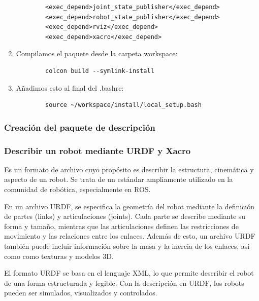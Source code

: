\begin{enumerate}
    \begin{lstlisting}
        <exec_depend>joint_state_publisher</exec_depend>
        <exec_depend>robot_state_publisher</exec_depend>
        <exec_depend>rviz</exec_depend>
        <exec_depend>xacro</exec_depend>
    \end{lstlisting}
    
    
    
    
    \item Compilamos el paquete desde la carpeta workspace:
    
    \begin{verbatim}
        colcon build --symlink-install
    \end{verbatim}
    
    \item Añadimos esto al final del .bashrc:
    \begin{verbatim}
        source ~/workspace/install/local_setup.bash
    \end{verbatim}
    
    \end{enumerate}
\subsubsection{Creación del paquete de descripción}

\subsubsection{Describir un robot mediante \ac{URDF} y Xacro}
Es un formato de archivo cuyo propósito es describir la estructura, cinemática y aspecto de un robot.  
Se trata de un estándar ampliamente utilizado en la comunidad de robótica, especialmente en \ac{ROS}.

En un archivo URDF, se especifica la geometría del robot mediante la definición de partes (links) y articulaciones (joints). 
Cada parte se describe mediante su forma y tamaño, mientras que las articulaciones definen las restricciones de movimiento y las relaciones entre los enlaces.
Además de esto, un archivo URDF también puede incluir información sobre la masa y la inercia de los enlaces, así como como texturas y modelos 3D.

El formato URDF se basa en el lenguaje \ac{XML}, lo que permite describir el robot de una forma estructurada y legible. Con la descripción 
en URDF, los robots pueden ser simulados, visualizados y controlados.

